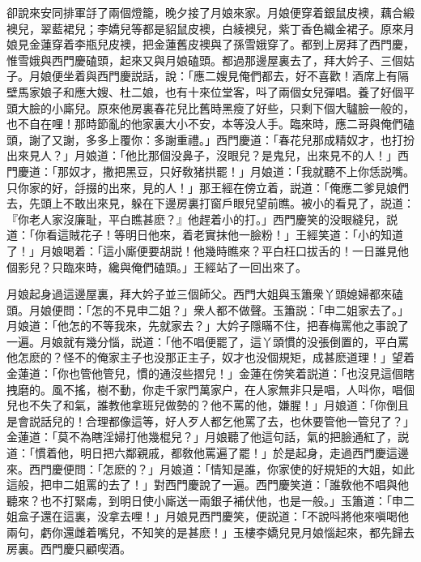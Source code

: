 卻說來安同排軍㧱了兩個燈籠，晚夕接了月娘來家。月娘便穿着銀鼠皮襖，藕合緞襖兒，翠藍裙兒；李嬌兒等都是貂鼠皮襖，白綾襖兒，紫丁香色織金裙子。原來月娘見金蓮穿着李瓶兒皮襖，把金蓮舊皮襖與了孫雪娥穿了。都到上房拜了西門慶，惟雪娥與西門慶磕頭，起來又與月娘磕頭。都過那邊屋裏去了，拜大妗子、三個姑子。月娘便坐着與西門慶説話，說：「應二嫂見俺們都去，好不喜歡！酒席上有隔壁馬家娘子和應大嫂、杜二娘，也有十來位堂客，呌了兩個女兒彈唱。養了好個平頭大臉的小廝兒。原來他房裏春花兒比舊時黑瘦了好些，只剩下個大驢臉一般的，也不自在哩！那時節亂的他家裏大小不安，本等没人手。臨來時，應二哥與俺們磕頭，謝了又謝，多多上覆你：多謝重禮。」西門慶道：「春花兒那成精奴才，也打扮出來見人？」月娘道：「他比那個没鼻子，沒眼兒？是鬼兒，出來見不的人！」西門慶道：「那奴才，撒把黑豆，只好敎猪拱罷！」月娘道：「我就聽不上你恁説嘴。只你家的好，㧱掇的出來，見的人！」那王經在傍立着，説道：「俺應二爹見娘們去，先頭上不敢出來見，躲在下邊房裏打窗戶眼兒望前瞧。被小的看見了，説道：『你老人家沒廉耻，平白瞧甚麽？』他趕着小的打。」西門慶笑的没眼縫兒，説道：「你看這賊花子！等明日他來，着老實抹他一臉粉！」王經笑道：「小的知道了！」月娘喝着：「這小廝便要胡説！他幾時瞧來？平白枉口拔舌的！一日誰見他個影兒？只臨來時，纔與俺們磕頭。」王經站了一回出來了。

月娘起身過這邊屋裏，拜大妗子並三個師父。西門大姐與玉簫衆丫頭媳婦都來磕頭。月娘便問：「怎的不見申二姐？」衆人都不做聲。玉簫説：「申二姐家去了。」月娘道：「他怎的不等我來，先就家去？」大妗子隱瞞不住，把春梅罵他之事說了一遍。月娘就有幾分惱，説道：「他不唱便罷了，這丫頭慣的没張倒置的，平白罵他怎麽的？怪不的俺家主子也没那正主子，奴才也没個規矩，成甚麽道理！」望着金蓮道：「你也管他管兒，慣的通沒些摺兒！」金蓮在傍笑着説道：「也沒見這個瞎拽磨的。風不搖，樹不動，你走千家門萬家户，在人家無非只是唱，人呌你，唱個兒也不失了和氣，誰教他拿班兒做勢的？他不罵的他，嫌腥！」月娘道：「你倒且是會説話兒的！合理都像這等，好人歹人都乞他罵了去，也休要管他一管兒了？」金蓮道：「莫不為瞎淫婦打他幾棍兒？」月娘聽了他這句話，氣的把臉通紅了，説道：「慣着他，明日把六鄰親戚，都敎他罵遍了罷！」於是起身，走過西門慶這邊來。西門慶便問：「怎麽的？」月娘道：「情知是誰，你家使的好規矩的大姐，如此這般，把申二姐罵的去了！」對西門慶說了一遍。西門慶笑道：「誰敎他不唱與他聽來？也不打緊䖏，到明日使小廝送一兩銀子補伏他，也是一般。」玉簫道：「申二姐盒子還在這裏，没拿去哩！」月娘見西門慶笑，便説道：「不說呌將他來嗔喝他兩句，虧你還雌着嘴兒，不知笑的是甚麽！」玉樓李嬌兒見月娘惱起來，都先歸去房裏。西門慶只顧喫酒。

